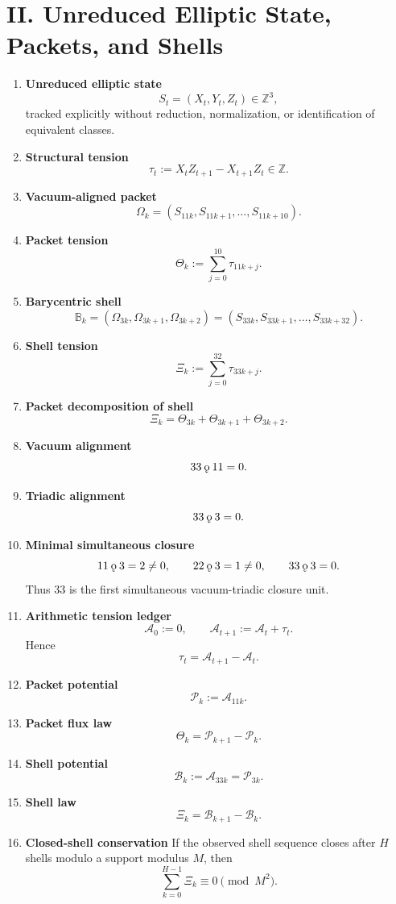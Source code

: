 \documentclass[11pt,letterpaper]{article}
\theoremstyle{plain}
\theoremstyle{definition}
\theoremstyle{remark}
\newcommand{\koppa}{\mathbin{\text{\rm\k{o}}}}
\begin{document}
\section*{II. Unreduced Elliptic State, Packets, and Shells}

\begin{enumerate}[resume]
\item \textbf{Unreduced elliptic state}
\[
S_t=(X_t,Y_t,Z_t)\in\mathbb Z^3,
\]
tracked explicitly without reduction, normalization, or identification of equivalent classes.

\item \textbf{Structural tension}
\[
\tau_t:=X_tZ_{t+1}-X_{t+1}Z_t\in\mathbb Z.
\]

\item \textbf{Vacuum-aligned packet}
\[
\Omega_k=(S_{11k},S_{11k+1},\dots,S_{11k+10}).
\]

\item \textbf{Packet tension}
\[
\Theta_k:=\sum_{j=0}^{10}\tau_{11k+j}.
\]

\item \textbf{Barycentric shell}
\[
\mathbb B_k=(\Omega_{3k},\Omega_{3k+1},\Omega_{3k+2})
=(S_{33k},S_{33k+1},\dots,S_{33k+32}).
\]

\item \textbf{Shell tension}
\[
\Xi_k:=\sum_{j=0}^{32}\tau_{33k+j}.
\]

\item \textbf{Packet decomposition of shell}
\[
\Xi_k=\Theta_{3k}+\Theta_{3k+1}+\Theta_{3k+2}.
\]

\item \textbf{Vacuum alignment}
\[
33\koppa 11=0.
\]

\item \textbf{Triadic alignment}
\[
33\koppa 3=0.
\]

\item \textbf{Minimal simultaneous closure}
\[
11\koppa 3=2\neq 0,\qquad 22\koppa 3=1\neq 0,\qquad 33\koppa 3=0.
\]
Thus \(33\) is the first simultaneous vacuum-triadic closure unit.

\item \textbf{Arithmetic tension ledger}
\[
\mathcal A_0:=0,\qquad \mathcal A_{t+1}:=\mathcal A_t+\tau_t.
\]
Hence
\[
\tau_t=\mathcal A_{t+1}-\mathcal A_t.
\]

\item \textbf{Packet potential}
\[
\mathcal P_k:=\mathcal A_{11k}.
\]

\item \textbf{Packet flux law}
\[
\Theta_k=\mathcal P_{k+1}-\mathcal P_k.
\]

\item \textbf{Shell potential}
\[
\mathcal B_k:=\mathcal A_{33k}=\mathcal P_{3k}.
\]

\item \textbf{Shell law}
\[
\Xi_k=\mathcal B_{k+1}-\mathcal B_k.
\]

\item \textbf{Closed-shell conservation}
If the observed shell sequence closes after \(H\) shells modulo a support modulus \(M\), then
\[
\sum_{k=0}^{H-1}\Xi_k\equiv 0\pmod{M^2}.
\]
\end{enumerate}
\end{document}
